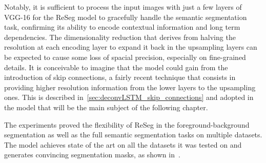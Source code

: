 %
Notably, it is sufficient to process the input images with just a few layers of
VGG-16 for the ReSeg model to gracefully handle the semantic segmentation task,
confirming its ability to encode contextual information and long term
dependencies. The dimensionality reduction that derives from halving the
resolution at each encoding layer to expand it back in the upsampling layers
can be expected to cause some loss of spacial precision, especially on
fine-grained details. It is conceivable to imagine that the model could gain
from the introduction of skip connections, a fairly recent technique that
consists in providing higher resolution information from the lower layers to
the upsampling ones. This is described
in~\autoref{sec:deconvLSTM_skip_connections} and adopted in the model that will
be the main subject of the following chapter.

The experiments proved the flexibility of ReSeg in the foreground-background
segmentation as well as the full semantic segmentation tasks on multiple
datasets. The model achieves state of the art on all the datasets it was tested
on and generates convincing segmentation masks, as shown
in~.
